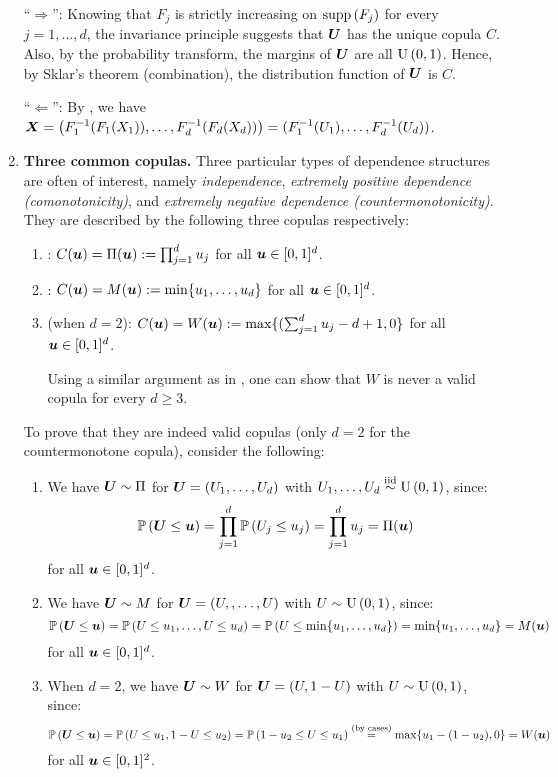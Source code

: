 \begin{enumerate}
\begin{pf}
``\(\Rightarrow\)'': Knowing that \(F_j\) is strictly increasing on
\(\operatorname{supp}\left(F_j\right)\) for every \(j=1,\dotsc,d\), the invariance principle suggests
that \(\bm{U}\) has the unique copula \(C\). Also, by the probability
transform, the margins of \(\bm{U}\) are all \(\operatorname{U}\left(0,1\right)\). Hence, by
Sklar's theorem (combination), the distribution function of \(\bm{U}\) is
\(C\).

``\(\Leftarrow\)'': By , we have
\(\bm{X}=\left(F_1^{-1}(F_1(X_1)),\dotsc,F_d^{-1}(F_d(X_d))\right)
=(F_{1}^{-1}(U_1),\dotsc,F_{d}^{-1}(U_d))\).
\end{pf}
\item \textbf{Three common copulas.} Three particular types of dependence
structures are often of interest, namely \emph{independence}, \emph{extremely
positive dependence (comonotonicity)}, and \emph{extremely negative dependence
(countermonotonicity)}. They are described by the following three copulas
respectively:
\begin{enumerate}
\item {}:
\(C(\bm{u})=\Pi(\bm{u}):=\prod_{j=1}^{d}u_j\) for all
\(\bm{u}\in[0,1]^{d}\).
\item {}:
\(C(\bm{u})=M(\bm{u}):=\min\{u_1,\dotsc,u_d\}\) for all
\(\bm{u}\in[0,1]^{d}\).
\item {} (when \(d=2\)):
\(C(\bm{u})=W(\bm{u}):=\max\{(\sum_{j=1}^{d}u_j-d+1,0\}\) for all
\(\bm{u}\in[0,1]^{d}\).
\begin{note}
Using a similar argument as in , one
can show that \(W\) is never a valid copula for every \(d\ge 3\).
\end{note}
\end{enumerate}
To prove that they are indeed valid copulas (only \(d=2\) for the
countermonotone copula), consider the following:

\begin{pf}
\begin{enumerate}
\item We have \(\bm{U}\sim \Pi\) for \(\bm{U}=(U_1,\dotsc,U_d)\) with
\(U_1,\dotsc,U_d\overset{\text{iid}}\sim \operatorname{U}\left(0,1\right)\), since:
\[
\mathbb{P}\left(\bm{U}\le\bm{u}\right)=\prod_{j=1}^{d}\mathbb{P}\left(U_j\le u_j\right)
=\prod_{j=1}^{d}u_j=\Pi(\bm{u})
\]
for all \(\bm{u}\in[0,1]^{d}\).
\item We have \(\bm{U}\sim M\) for \(\bm{U}=(U,,\dotsc,U)\) with
\(U\sim\operatorname{U}\left(0,1\right)\), since:
\[
\mathbb{P}\left(\bm{U}\le\bm{u}\right)=\mathbb{P}\left(U\le u_1,\dotsc,U\le u_d\right)
=\mathbb{P}\left(U\le\min\{u_1,\dotsc,u_d\}\right)
=\min\{u_1,\dotsc,u_d\}=M(\bm{u})
\]
for all \(\bm{u}\in[0,1]^{d}\).
\item When \(d=2\), we have \(\bm{U}\sim W\) for \(\bm{U}=(U,1-U)\) with
\(U\sim\operatorname{U}\left(0,1\right)\), since:
\[
\mathbb{P}\left(\bm{U}\le\bm{u}\right)=\mathbb{P}\left(U\le u_1,1-U\le u_2\right)
=\mathbb{P}\left(1-u_2\le U\le u_1\right)
\overset{\text{(by cases)}}{=}
\max\{u_1-(1-u_2),0\}
=W(\bm{u})
\]
for all \(\bm{u}\in[0,1]^{2}\).
\end{enumerate}
\end{pf}


\end{enumerate}
